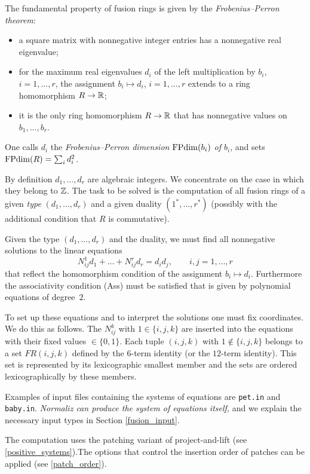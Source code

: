The fundamental property of fusion rings is given by the \emph{Frobenius--Perron theorem}:
\begin{itemize}
\item a square matrix with nonnegative integer entries has a nonnegative real eigenvalue;
\item for the maximum real eigenvalues $d_i$ of the left multiplication by $b_i$, $i=1,\dots,r$, the assignment $b_i \mapsto d_i$, $i=1,\dots,r$ extends to a ring homomorphism $R\to {\mathbb R}$;
\item it is the only ring homomorphism $R\to {\mathbb R}$ that has nonnegative values on $b_1,\dots,b_r$.
\end{itemize}

One calls $d_i$ the  \label{FPdim} \emph{Frobenius--Perron dimension $\operatorname{FPdim}(b_i)$ of $b_i$}, and sets $\operatorname{FPdim}(R) = \sum_i d_i^2$.

By definition $d_1,\dots,d_r$ are algebraic integers. We concentrate on the case in which they belong to ${\mathbb Z}$. The task to be solved is the computation of all fusion rings of a given \emph{type} $(d_1,\dots,d_r)$ and a given duality $(1^*,\dots,r^*)$ (possibly with the additional condition that $R$ is commutative).

Given the type $(d_1,\dots,d_r)$ and the duality, we must find all nonnegative solutions to the linear equations
$$
N_{ij}^1d_1 +\dots + N_{ij}^rd_r = d_id_j, \qquad i,j = 1,\dots,r
$$
that reflect the homomorphism condition of the assignment $b_i\mapsto d_i$. Furthermore the associativity condition (Ass) must be satisfied that is given by polynomial equations of degree~$2$.

To set up these equations and to interpret the solutions one must fix coordinates. We do this as follows.  The $N_{ij}^k$ with $1\in \{i,j,k\}$ are inserted into the equations with their fixed values $\in \{0,1\}$. Each tuple $(i,j,k)$ with $1\notin \{i,j,k\}$ belongs to a set $FR(i,j,k)$ defined by the $6$-term identity (or the $12$-term identity). This set is represented by its lexicographic smallest member and the sets are ordered lexicographically by these members.

Examples of input files containing the systems of equations are \verb*|pet.in| and \verb*|baby.in|. \emph{Normaliz can produce the system of equations itself,} and we explain the necessary input types in Section \ref{fusion_input}.

The computation uses the patching variant of project-and-lift (see \ref{positive_systems}).The options that control the insertion order of patches can be applied (see \ref{patch_order}).

